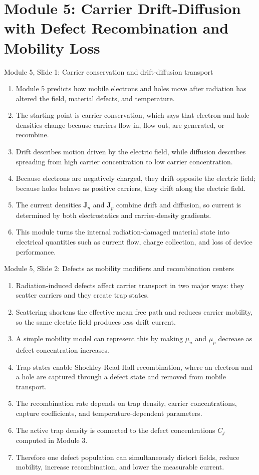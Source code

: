 \documentclass[11pt]{article}
\newcommand{\Jn}{\bm{J}_n}
\newcommand{\Jp}{\bm{J}_p}
\begin{document}
\section{Module 5: Carrier Drift-Diffusion with Defect Recombination and Mobility Loss}

\begin{slidebox}{Module 5, Slide 1: Carrier conservation and drift-diffusion transport}
\begin{enumerate}
\item Module 5 predicts how mobile electrons and holes move after radiation has altered the field, material defects, and temperature.
\item The starting point is carrier conservation, which says that electron and hole densities change because carriers flow in, flow out, are generated, or recombine.
\item Drift describes motion driven by the electric field, while diffusion describes spreading from high carrier concentration to low carrier concentration.
\item Because electrons are negatively charged, they drift opposite the electric field; because holes behave as positive carriers, they drift along the electric field.
\item The current densities \(\Jn\) and \(\Jp\) combine drift and diffusion, so current is determined by both electrostatics and carrier-density gradients.
\item This module turns the internal radiation-damaged material state into electrical quantities such as current flow, charge collection, and loss of device performance.
\end{enumerate}
\end{slidebox}

\begin{slidebox}{Module 5, Slide 2: Defects as mobility modifiers and recombination centers}
\begin{enumerate}
\item Radiation-induced defects affect carrier transport in two major ways: they scatter carriers and they create trap states.
\item Scattering shortens the effective mean free path and reduces carrier mobility, so the same electric field produces less drift current.
\item A simple mobility model can represent this by making \(\mu_n\) and \(\mu_p\) decrease as defect concentration increases.
\item Trap states enable Shockley-Read-Hall recombination, where an electron and a hole are captured through a defect state and removed from mobile transport.
\item The recombination rate depends on trap density, carrier concentrations, capture coefficients, and temperature-dependent parameters.
\item The active trap density is connected to the defect concentrations \(C_j\) computed in Module 3.
\item Therefore one defect population can simultaneously distort fields, reduce mobility, increase recombination, and lower the measurable current.
\end{enumerate}
\end{slidebox}
\end{document}
